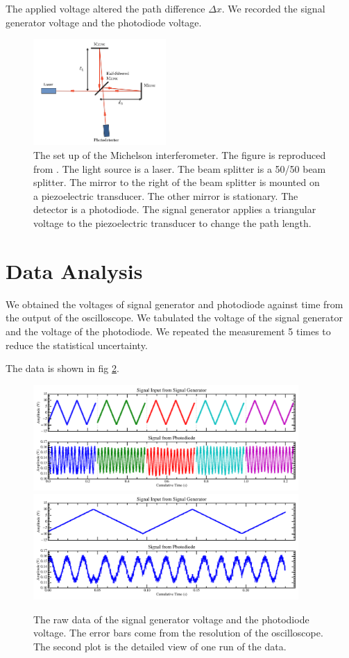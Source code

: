 The applied voltage altered the path difference $\Delta x$. We recorded the signal generator voltage and the photodiode voltage. 
\begin{figure}
    \centering
    \includegraphics[width=0.45\textwidth]{fig/michelson_setup.png}
    \caption{The set up of the Michelson interferometer. The figure is reproduced from \cite{MITOpticalInterferometry2023}. The light source is a laser. The beam splitter is a 50/50 beam splitter. The mirror to the right of the beam splitter is mounted on a piezoelectric transducer. The other mirror is stationary. The detector is a photodiode. The signal generator applies a triangular voltage to the piezoelectric transducer to change the path length.}
    \label{fig:set_up}
\end{figure}

\section{Data Analysis}
We obtained the voltages of signal generator and photodiode against time from the output of the oscilloscope. We tabulated the voltage of the signal generator and the voltage of the photodiode. We repeated the measurement 5 times to reduce the statistical uncertainty.

The data is shown in fig \ref{fig:raw_data}. 
\begin{figure}
    \centering
    \includegraphics[width=0.9\textwidth]{fig/raw_data.png}
    \includegraphics[width = 0.9\textwidth]{fig/single_raw_data.png}
    \caption{The raw data of the signal generator voltage and the photodiode voltage. The error bars come from the resolution of the oscilloscope. The second plot is the detailed view of one run of the data.}
    \label{fig:raw_data}
\end{figure}


